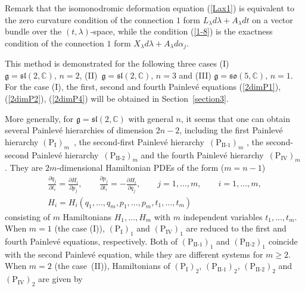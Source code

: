 \documentclass[10pt,a4paper]{amsart}
\numberwithin{equation}{section}
\begin{document}
Remark that the isomonodromic deformation equation (\ref{Lax1}) is equivalent to the zero curvature condition of the connection $1$ form $L_\lambda d\lambda + A_\lambda dt$ on a vector bundle over the $(t,\lambda )$-space, while the condition (\ref{1-8}) is the exactness condition of the connection $1$ form $X_\lambda d\lambda + A_\lambda d\alpha _j$.

This method is demonstrated for the following three cases (I) $\mathfrak{g} = \mathfrak{sl}(2, \mathbb{C}),\,n = 2$,
(II)~$\mathfrak{g} = \mathfrak{sl}(2, \mathbb{C}),\,n = 3$ and (III) $\mathfrak{g} = \mathfrak{so}(5, \mathbb{C}),\,n =1$.
For the case (I), the f\/irst, second and fourth Painlev\'{e} equations (\ref{2dimP1}), (\ref{2dimP2}), (\ref{2dimP4})
will be obtained in Section~\ref{section3}.

More generally, for $\mathfrak{g} = \mathfrak{sl}(2, \mathbb{C})$ with general $n$, it seems that one can obtain several Painlev\'{e} hierarchies of dimension $2n-2$, including the f\/irst Painlev\'{e} hierarchy $(\text{P}_\text{I})_m$~\cite{Koi, Kud, Shi}, the second-f\/irst Painlev\'{e} hierarchy~$(\text{P}_\text{II-1})_m$ \cite{CJM, CJP, Koi, Kud}, the second-second Painlev\'{e} hierarchy~$(\text{P}_\text{II-2})_m$ and the fourth Painlev\'{e} hierarchy~$(\text{P}_\text{IV})_m$ \cite{GJP, Koi}. They are $2m$-dimensional Hamiltonian PDEs of the form ($m=n-1$)
\begin{gather*}
\frac{\partial q_j}{\partial t_i} = \frac{\partial H_i}{\partial p_j},\qquad
\frac{\partial p_j}{\partial t_i} = -\frac{\partial H_i}{\partial q_j},\qquad j=1,\dots ,m, \qquad i=1,\dots ,m, \\
H_i = H_i(q_1, \dots ,q_m, p_1, \dots ,p_m, t_1, \dots ,t_m)
\end{gather*}
consisting of $m$ Hamiltonians $H_1, \dots ,H_m$ with $m$ independent variables $t_1, \dots ,t_m$. When $m=1$ (the case (I)), $(\text{P}_\text{I})_1$ and $(\text{P}_\text{IV})_1$ are reduced to the f\/irst and fourth Painlev\'{e} equations, respectively. Both of $(\text{P}_\text{II-1})_1$ and $(\text{P}_\text{II-2})_1$ coincide with the second Painlev\'{e} equation, while they are dif\/ferent systems for $m\geq 2$. When $m=2$ (the case~(II)), Hamiltonians of $(\text{P}_\text{I})_2$, $(\text{P}_\text{II-1})_2$, $(\text{P}_\text{II-2})_2$ and $(\text{P}_\text{IV})_2$ are given by
\end{document}
